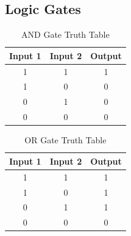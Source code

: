 \documentclass[twocolumn,english]{IEEEtran}
\begin{document}
\subsection{\textbf{Logic Gates}}

\begin{table}[H]
\centering{}
\caption{AND Gate Truth Table}
\begin{tabular}{@{}ccc@{}}
\toprule
\textbf{Input 1} & \multicolumn{1}{l}{\textbf{Input 2}} & \multicolumn{1}{l}{\textbf{Output}} \\ \midrule
1                & 1                                    & 1                                   \\
1                & 0                                    & 0                                   \\
0                & 1                                    & 0                                   \\
0                & 0                                    & 0                                   \\ \bottomrule
\end{tabular}
\end{table}

\begin{table}[h]
\centering{}
\caption{OR Gate Truth Table}
\begin{tabular}{@{}ccc@{}}
\toprule
\textbf{Input 1} & \multicolumn{1}{l}{\textbf{Input 2}} & \multicolumn{1}{l}{\textbf{Output}} \\ \midrule
1                & 1                                    & 1                                   \\
1                & 0                                    & 1                                   \\
0                & 1                                    & 1                                   \\
0                & 0                                    & 0                                   \\ \bottomrule
\end{tabular}
\end{table}


\appendices{}

%
%
\end{document}
